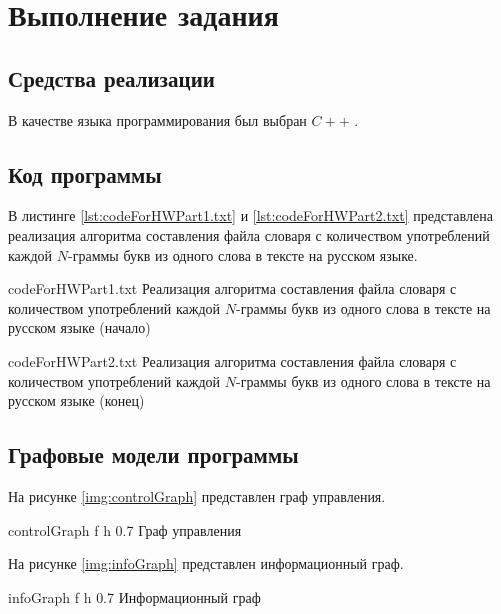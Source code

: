 \chapter{Выполнение задания}

\section{Средства реализации}

В качестве языка программирования был выбран $C++$ \cite{pl}.

\section{Код программы}

В листинге \ref{lst:codeForHWPart1.txt} и \ref{lst:codeForHWPart2.txt}  представлена реализация алгоритма составления файла словаря с количеством употреблений каждой $N$-граммы букв из одного слова в тексте на русском языке.

{codeForHWPart1.txt} %
{Реализация алгоритма составления файла словаря с количеством употреблений каждой $N$-граммы букв из одного слова в тексте на русском языке (начало)} %

{codeForHWPart2.txt} %
{Реализация алгоритма составления файла словаря с количеством употреблений каждой $N$-граммы букв из одного слова в тексте на русском языке (конец)} %


\section{Графовые модели программы}

На рисунке \ref{img:controlGraph} представлен граф управления.

{controlGraph} %
{f} %
{h} %
{0.7\textwidth} %
{Граф управления} %

\clearpage

На рисунке \ref{img:infoGraph} представлен информационный граф.

{infoGraph} %
{f} %
{h} %
{0.7\textwidth} %
{Информационный граф} %

